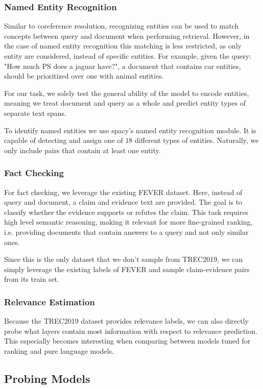 \subsubsection{Named Entity Recognition}
Similar to coreference resolution, recognizing entities can be used to match concepts between query and document when performing retrieval. However, in the case of named entity recognition this matching is less restricted, as only entity  are considered, instead of specific entities. For example, given the query: "How much PS does a jaguar have?", a document that contains car entities, should be prioritized over one with animal entities.

For our task, we solely test the general ability of the model to encode entities, meaning we treat document and query as a whole and predict entity types of separate text spans.

To identify named entities we use spacy's \cite{spacy2} named entity recognition module. It is capable of detecting and assign one of $18$ different types of entities. Naturally, we only include pairs that contain at least one entity.

\subsubsection{Fact Checking}
For fact checking, we leverage the existing FEVER \cite{thorne-etal-2018-fever} dataset. Here, instead of query and document, a claim and evidence text are provided. The goal is to classify whether the evidence supports or refutes the claim. This task requires high level semantic reasoning, making it relevant for more fine-grained ranking, i.e. providing documents that contain  answers to a query and not only similar ones.

Since this is the only dataset that we don't sample from TREC2019, we can simply leverage the existing labels of FEVER and sample claim-evidence pairs from its train set.

\subsubsection{Relevance Estimation}
Because the TREC2019 dataset provides relevance labels, we can also directly probe what layers contain most information with respect to relevance prediction. This especially becomes interesting when comparing between models tuned for ranking and pure language models.

\subsection{Probing Models}

